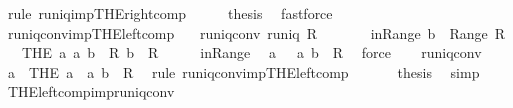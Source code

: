 \begin{isabellebody}
\ {\isacharparenleft}rule\ runiq{\isacharunderscore}imp{\isacharunderscore}THE{\isacharunderscore}right{\isacharunderscore}comp{\isacharparenright}\isanewline
\ \ \isamarkupfalse%
\ \isamarkupfalse%
\ {\isacharquery}thesis\ \isamarkupfalse%
\ fastforce\isanewline
{}\isamarkupfalse%
%
\endisatagproof
{\isafoldproof}%
%
\isadelimproof
\isanewline
%
\endisadelimproof
\isanewline
{}\isamarkupfalse%
\ runiq{\isacharunderscore}conv{\isacharunderscore}imp{\isacharunderscore}THE{\isacharunderscore}left{\isacharunderscore}comp{\isacharprime}{\isacharcolon}\isanewline
\ \ \ runiq{\isacharunderscore}conv{\isacharcolon}\ {\isachardoublequoteopen}runiq\ {\isacharparenleft}R{\isasyminverse}{\isacharparenright}{\isachardoublequoteclose}\isanewline
\ \ \ \ \ \ \ in{\isacharunderscore}Range{\isacharcolon}\ {\isachardoublequoteopen}b\ {\isasymin}\ Range\ R{\isachardoublequoteclose}\isanewline
\ \ \ {\isachardoublequoteopen}{\isacharparenleft}THE\ a{\isachardot}\ {\isacharparenleft}a{\isacharcomma}\ b{\isacharparenright}\ {\isasymin}\ R{\isacharcomma}\ b{\isacharparenright}\ {\isasymin}\ R{\isachardoublequoteclose}\isanewline
%
\isadelimproof
%
\endisadelimproof
%
\isatagproof
{}\isamarkupfalse%
\ {\isacharminus}\isanewline
\ \ \isamarkupfalse%
\ in{\isacharunderscore}Range\ \isamarkupfalse%
\ a\ \ {\isacharasterisk}{\isacharcolon}\ {\isachardoublequoteopen}{\isacharparenleft}a{\isacharcomma}\ b{\isacharparenright}\ {\isasymin}\ R{\isachardoublequoteclose}\ \isamarkupfalse%
\ force\isanewline
\ \ \isamarkupfalse%
\ runiq{\isacharunderscore}conv\ \isamarkupfalse%
\ {\isachardoublequoteopen}a\ {\isacharequal}\ {\isacharparenleft}THE\ a\ {\isachardot}\ {\isacharparenleft}a{\isacharcomma}\ b{\isacharparenright}\ {\isasymin}\ R{\isacharparenright}{\isachardoublequoteclose}\ \isamarkupfalse%
\ {\isacharparenleft}rule\ runiq{\isacharunderscore}conv{\isacharunderscore}imp{\isacharunderscore}THE{\isacharunderscore}left{\isacharunderscore}comp{\isacharparenright}\isanewline
\ \ \isamarkupfalse%
\ {\isacharasterisk}\ \isamarkupfalse%
\ {\isacharquery}thesis\ \isamarkupfalse%
\ simp\isanewline
{}\isamarkupfalse%
%
\endisatagproof
{\isafoldproof}%
%
\isadelimproof
\isanewline
%
\endisadelimproof
\isanewline
{}\isamarkupfalse%
\ THE{\isacharunderscore}left{\isacharunderscore}comp{\isacharunderscore}imp{\isacharunderscore}runiq{\isacharunderscore}conv{\isacharcolon}\isanewline

\end{isabellebody}
